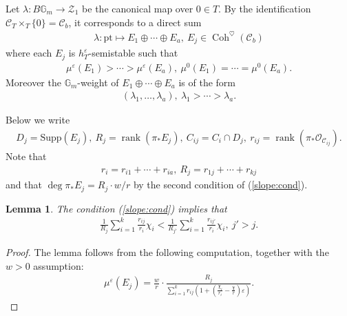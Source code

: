 \documentclass[11pt,oneside,a4paper,mathscr]{amsart}
\newtheorem{lemma}[thm]{Lemma}
\theoremstyle{definition}
\newcommand{\cC}{\mathcal{C}}
\newcommand{\bgm}{B\mathbb{G}_m}
\newcommand{\Coh}{\operatorname{Coh}}
\begin{document}
Let $\lambda \colon \bgm \to \mathcal{Z}_1$ be the canonical 
map over $0\in T$. By the identification $\cC_T\times_T \{0\}=\cC_b$, it corresponds to a direct sum 
\begin{align}\label{map:lambda}
    \lambda \colon \mathrm{pt} \mapsto E_1 \oplus \cdots \oplus E_a, \ E_j \in \Coh^{\heartsuit}(\cC_b)
\end{align}
where each $E_j$ is $h_T^{\varepsilon}$-semistable such that 
\begin{align}\label{slope:cond}
 \mu^{\varepsilon}(E_1)>\cdots>\mu^{\varepsilon}(E_a), \ 
 \mu^0(E_1)=\cdots=\mu^0(E_a). 
 \end{align}
 Moreover the $\mathbb{G}_m$-weight of $E_1 \oplus \cdots \oplus E_a$ is 
 of the form 
\begin{align*}(\lambda_1, \ldots, \lambda_a), \ 
\lambda_1>\cdots>\lambda_a.
\end{align*}



Below we write 
\begin{align*}
D_j=\mathrm{Supp}(E_j), \ R_j=\operatorname{rank}(\pi_{*}E_j), \ 
C_{ij}=C_i \cap D_j, \ r_{ij}=\operatorname{rank}(\pi_{*}\mathcal{O}_{\cC_{ij}}).
\end{align*}
Note that 
\begin{align*}
    r_i=r_{i1}+\cdots+r_{ia}, \ R_j=r_{1j}+\cdots+r_{kj}
\end{align*}
and that $\deg \pi_{*}E_j=R_j \cdot w/r$ by the second condition of (\ref{slope:cond}). 
\begin{lemma}\label{slope:equiv}
   The condition (\ref{slope:cond}) implies that 
\begin{align}\label{slope:cond2}
\frac{1}{R_j}\sum_{i=1}^k \frac{r_{ij}}{r_i}\chi_i < 
\frac{1}{R_{j'}}\sum_{i=1}^k \frac{r_{ij'}}{r_i}\chi_i, \ j'>j.
\end{align} 
\end{lemma}
\begin{proof}
The lemma follows from the following computation, together with the $w>0$ assumption: 
\begin{align*}
    \mu^{\varepsilon}(E_j)=\frac{w}{r} \cdot \frac{R_j}{\sum_{i=1}^k r_{ij}\left(1+ \left(\frac{\chi_i}{r_i}-\frac{\chi}{r}\right)\varepsilon \right)}.
\end{align*}
\end{proof}
\end{document}
